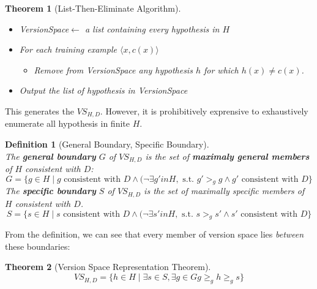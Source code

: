 \documentclass[12pt]{article}
\newtheorem{definition}{Definition}[section]
\newtheorem{theorem}{Theorem}[section]
\theoremstyle{definition}
\begin{document}
\begin{theorem}[List-Then-Eliminate Algorithm]
\hfill\\\normalfont \begin{itemize}
\item \textit{VersionSpace}$\leftarrow$ a list containing every hypothesis in $H$
\item For each training example $\langle x, c(x)\rangle$
\begin{itemize}
	\item Remove from \textit{VersionSpace} any hypothesis $h$ for which $h(x)\neq c(x)$.
\end{itemize}
\item Output the list of hypothesis in \textit{VersionSpace}
\end{itemize}
\end{theorem}
This generates the $VS_{H,D}$. However, it is prohibitively exprensive to exhaustively enumerate all hypothesis in finite $H$.
\begin{definition}[General Boundary, Specific Boundary]
\hfill\\\normalfont The \textbf{general boundary} $G$ of $VS_{H,D}$ is the set of \textbf{maximaly general members} of $H$ consistent with $D$:
\[
G=\{g\in H\mid g\text{ consistent with } D \land (\neg \exists g' in H,\text{ s.t. } g'>_g g \land g' \text{ consistent with } D\}
\]
The \textbf{specific boundary} $S$ of $VS_{H,D}$ is the set of maximally specific members of $H$ consistent with $D$.
\[
S=\{s\in H\mid s\text{ consistent with } D \land (\neg \exists s' in H,\text{ s.t. } s>_g s' \land s' \text{ consistent with } D\}
\]
\end{definition}
From the definition, we can see that every member of version space lies \textit{between} these boundaries:
\begin{theorem}[Version Space Representation Theorem]
\hfill\\\normalfont 
\[
VS_{H,D}=\{h\in H\mid \exists s\in S, \exists g\in G g\geq_g h\geq_g s\}
\]
\end{theorem}
\end{document}
